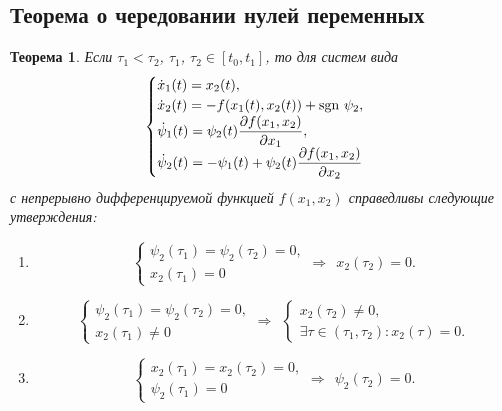 \documentclass[a4paper,12pt]{article}
\newtheorem{thm}{Теорема}
\begin{document}
\subsection{Теорема о чередовании нулей переменных}
\begin{thm}
Если $\tau_1 < \tau_2$, $\tau_1$, $\tau_2 \in [t_0, t_1]$, то для систем вида 
\begin{equation}\label{eq*}	
\begin{cases}
	\dot{x}_1(t) = x_2(t), \\
	\dot{x}_2(t) = -f(x_1(t), x_2(t)) + \mathrm{sgn}  \ \psi_2, \\
	\dot{\psi}_1(t) = \psi_2(t) \dfrac{\partial f(x_1, x_2)}{\partial x_1}, \\
	\dot{\psi}_2(t) = -\psi_1(t) + \psi_2(t) \dfrac{\partial f(x_1, x_2)}{\partial x_2}
\end{cases}
\end{equation}
с непрерывно дифференцируемой функцией $f(x_1, x_2)$ справедливы следующие утверждения:

\begin{enumerate}
	\item 
\begin{equation}\label{eq8}	
	\begin{cases}
		\psi_2(\tau_1) = \psi_2(\tau_2) = 0, \\
		x_2(\tau_1) = 0
	\end{cases} \Rightarrow \ \ x_2(\tau_2) = 0.
\end{equation}

	\item 
\begin{equation}\label{eq9}	
	\begin{cases}
		\psi_2(\tau_1) = \psi_2(\tau_2) = 0, \\
		x_2(\tau_1) \neq 0
	\end{cases} \Rightarrow \ \ 
	\begin{cases}
		x_2(\tau_2) \neq 0, \\
		\exists \tau \in (\tau_1, \tau_2): x_2(\tau) = 0.
	\end{cases} 
\end{equation}

	\item
\begin{equation}\label{eq10}	
	\begin{cases}
		x_2(\tau_1) = x_2(\tau_2) = 0, \\
		\psi_2(\tau_1) = 0
	\end{cases} \Rightarrow \ \ 
	\psi_2(\tau_2) = 0.
\end{equation}


\end{enumerate}
\end{thm}
\end{document}
